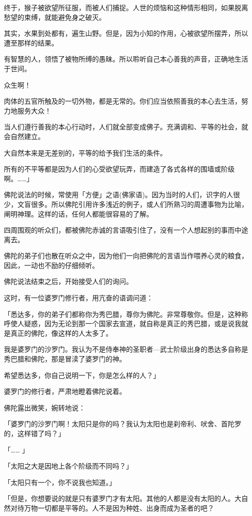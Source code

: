 \documentclass[twoside,openany]{book}
\begin{document}
终于，猴子被欲望所征服，而被人们捕捉。人世的烦恼和这种情形相同，如果脱离愁望的束缚，就能避免身之破灭。

其实，水果到处都有，遍生山野。但是，因为小知的作用，心被欲望所摆弄，所以遭至那样的结果。

有智慧的人，领悟了被物所缚的愚昧。所以聆听自己本心善我的声音，正确地生活于世间。

众生啊！

肉体的五官所触及的一切外物，都是无常的。你们应当依照善我的本心去生活，努力地服务大众！

当人们遵行善我的本心行动时，人们就全部变成佛子。充满调和、平等的社会，就会自然建立。

大自然本来是无差别的，平等的给予我们生活的条件。

所有的不平等都是因为人们的心受欲望玩弄，而建造了各式各样的围墙或阶级啊。……」		

佛陀说法的时候，常使用「方便」之语(佛家语)。因为当时的人们，识字的人很少，文盲很多。所以佛陀引用许多浅近的例子，或人们所熟习的周遭事物为比喻，阐明神理。这样的话，任何人都能很容易的了解。

四周围观的听众们，都被佛陀赤诚的言语吸引住了，没有一个人想起别的事而中途离去。

佛陀的弟子们也散在听众之中，因为他们一向把佛陀的言语当作喂养心灵的粮食，因此，一动也不励的仔细倾听。

佛陀说法结束之后，开始接受人们的询问。

这时，有一位婆罗门修行者，用亢奋的语调问道：

「悉达多，你的弟子们都称你为秀巴腊，尊你为佛陀。非常尊敬你。但是，这种称呼使人疑惑，因为无论到那一个国家去宣道，就自称是真正的秀巴腊，或是说我就是真正的佛陀，像这样的人太多了。

我是婆罗门的沙罗门。我认为不是侍奉神的圣职者---武士阶级出身的悉达多自称是秀巴腊和佛陀，那是冒渎了婆罗门的神。

希望悉达多，你自己说明一下，你是怎么样的人？」

婆罗门的修行者，严肃地瞪着佛陀说着。

佛陀露出微笑，婉转地说：

「婆罗门的沙罗门啊！太阳只是你的吗？我认为太阳也是刹帝利、吠舍、首陀罗的，这样错了吗？」

「……	」

「太阳之大是因地上各个阶级而不同吗？」

「太阳只有一个，你不说我也知道。」

「但是，你想要说的就是只有婆罗门才有太阳。其他的人都是没有太阳的人。大自然对待万物一切都是平等的。人不是因为种姓、出身而成为圣者的吧？
\end{document}
